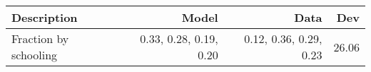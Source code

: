 \begin{tabular}{lrrr}
\hline
Description & Model  & Data  & Dev  \\ 
\hline
Fraction by schooling & 0.33, 0.28, 0.19, 0.20  & 0.12, 0.36, 0.29, 0.23  & 26.06  \\ 
\hline
\end{tabular}%
